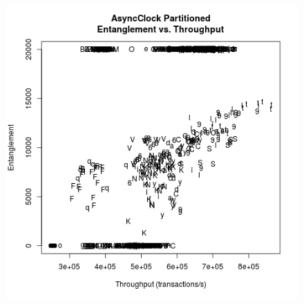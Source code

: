 \begin{figure}
\center
\includegraphics[height=.4\textheight]{async_partitioned_throughput_entanglement.png}
\caption{\label{async_partitioned_throughput_entanglement}}
\end{figure}

